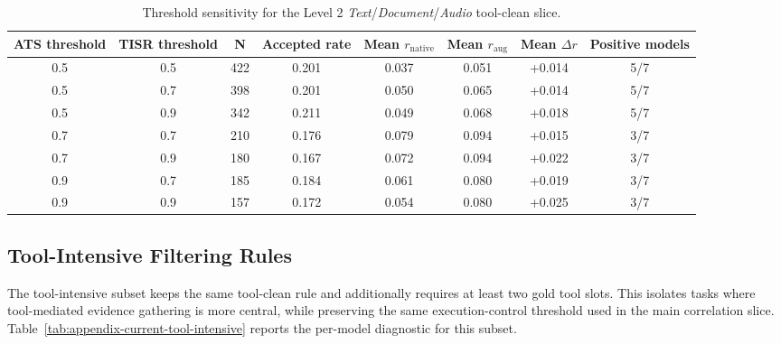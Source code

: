 \documentclass{article}
\begin{document}
\begin{table}[H]
\centering
\scriptsize
\setlength{\tabcolsep}{6pt}
\begin{tabular}{cccccccc}
\toprule
ATS threshold & TISR threshold & N & Accepted rate & Mean $r_{\mathrm{native}}$ & Mean $r_{\mathrm{aug}}$ & Mean $\Delta r$ & Positive models \\
\midrule
0.5 & 0.5 & 422 & 0.201 & 0.037 & 0.051 & +0.014 & 5/7 \\
0.5 & 0.7 & 398 & 0.201 & 0.050 & 0.065 & +0.014 & 5/7 \\
0.5 & 0.9 & 342 & 0.211 & 0.049 & 0.068 & +0.018 & 5/7 \\
0.7 & 0.7 & 210 & 0.176 & 0.079 & 0.094 & +0.015 & 3/7 \\
0.7 & 0.9 & 180 & 0.167 & 0.072 & 0.094 & +0.022 & 3/7 \\
0.9 & 0.7 & 185 & 0.184 & 0.061 & 0.080 & +0.019 & 3/7 \\
0.9 & 0.9 & 157 & 0.172 & 0.054 & 0.080 & +0.025 & 3/7 \\
\bottomrule
\end{tabular}
\vspace{0.05cm}
\caption{Threshold sensitivity for the Level 2 \emph{Text}/\emph{Document}/\emph{Audio} tool-clean slice.}
\label{tab:stable-tool-use-threshold-sensitivity}
\end{table}

\subsection{Tool-Intensive Filtering Rules}
\label{sec:appendix-tool-intensive-detail}
The tool-intensive subset keeps the same tool-clean rule and additionally requires at least two gold tool slots. This isolates tasks where tool-mediated evidence gathering is more central, while preserving the same execution-control threshold used in the main correlation slice. Table~\ref{tab:appendix-current-tool-intensive} reports the per-model diagnostic for this subset.
\end{document}
